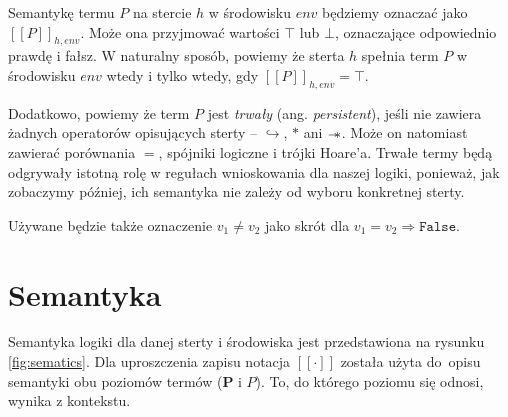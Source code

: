 \documentclass[]{pracamgr}
\newcommand \wand {\mathrel{-\mkern-6mu*}}
\newcommand \outerP {\mathbf{P}}
\renewcommand \| {\hspace{0.75em} | \hspace{0.75em} }
\renewcommand \[ {[\![}
\renewcommand \] {]\!]}
\theoremstyle{definition}
\begin{document}
Semantykę termu $P$ na stercie $h$ w środowisku $env$ będziemy oznaczać jako
$\[ P \]_{h, env}$. Może ona przyjmować wartości $\top$ lub $\bot$, oznaczające odpowiednio
prawdę i fałsz. W naturalny sposób, powiemy że sterta $h$ spełnia term $P$ w środowisku $env$
wtedy i tylko wtedy, gdy $\[ P \]_{h, env} = \top$.

Dodatkowo, powiemy że term $P$ jest \textit{trwały} (ang. \textit{persistent}),
jeśli nie zawiera żadnych operatorów opisujących sterty -- $\hookrightarrow$, $*$ ani $\wand$.
Może on natomiast zawierać porównania $=$, spójniki logiczne i trójki Hoare'a.
Trwałe termy będą odgrywały istotną rolę w regułach wnioskowania dla naszej logiki,
ponieważ, jak zobaczymy później, ich semantyka nie zależy od wyboru konkretnej sterty.

Używane będzie także oznaczenie $v_1 \neq v_2$ jako skrót dla $v_1 = v_2 \Rightarrow \mathtt{False}$.

\section{Semantyka}

Semantyka logiki dla danej sterty i środowiska jest przedstawiona na rysunku \ref{fig:sematics}.
Dla uproszczenia zapisu notacja $\[ \cdot \]$ została użyta do~opisu semantyki obu poziomów termów
($\outerP$ i $P$). To, do którego poziomu się odnosi, wynika z kontekstu.
\end{document}
